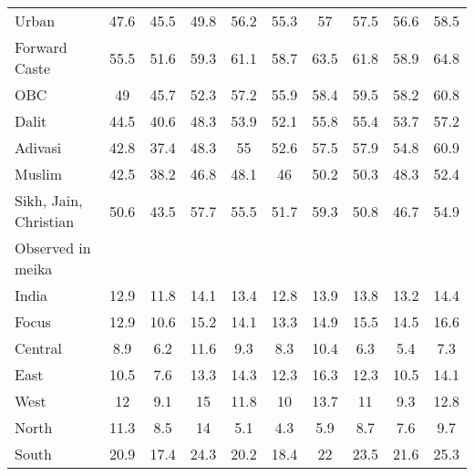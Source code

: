 \begin{tabular}{l*{9}{c}}
Urban               &        47.6&        45.5&        49.8&        56.2&        55.3&          57&        57.5&        56.6&        58.5\\
Forward Caste       &        55.5&        51.6&        59.3&        61.1&        58.7&        63.5&        61.8&        58.9&        64.8\\
OBC                 &          49&        45.7&        52.3&        57.2&        55.9&        58.4&        59.5&        58.2&        60.8\\
Dalit               &        44.5&        40.6&        48.3&        53.9&        52.1&        55.8&        55.4&        53.7&        57.2\\
Adivasi             &        42.8&        37.4&        48.3&          55&        52.6&        57.5&        57.9&        54.8&        60.9\\
Muslim              &        42.5&        38.2&        46.8&        48.1&          46&        50.2&        50.3&        48.3&        52.4\\
Sikh, Jain, Christian&        50.6&        43.5&        57.7&        55.5&        51.7&        59.3&        50.8&        46.7&        54.9\\
\midrule
Observed in meika   &            &            &            &            &            &            &            &            &            \\
India               &        12.9&        11.8&        14.1&        13.4&        12.8&        13.9&        13.8&        13.2&        14.4\\
Focus               &        12.9&        10.6&        15.2&        14.1&        13.3&        14.9&        15.5&        14.5&        16.6\\
Central             &         8.9&         6.2&        11.6&         9.3&         8.3&        10.4&         6.3&         5.4&         7.3\\
East                &        10.5&         7.6&        13.3&        14.3&        12.3&        16.3&        12.3&        10.5&        14.1\\
West                &          12&         9.1&          15&        11.8&          10&        13.7&          11&         9.3&        12.8\\
North               &        11.3&         8.5&          14&         5.1&         4.3&         5.9&         8.7&         7.6&         9.7\\
South               &        20.9&        17.4&        24.3&        20.2&        18.4&          22&        23.5&        21.6&        25.3\\

\end{tabular}
